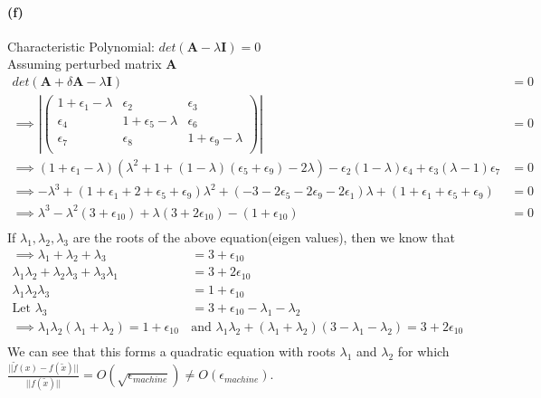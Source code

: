 \documentclass[12pt, letterpaper]{article}
\begin{document}
\paragraph{(f)} Characteristic Polynomial: $det(\mathbf{A}-\lambda \mathbf{I}) = 0$\\

Assuming perturbed matrix \textbf{A}
\begin{align*}
  det(\mathbf{A} + \delta\mathbf{A} - \lambda\mathbf{I}) &= 0\\
  \implies \left|
  \begin{pmatrix}
    1 + \epsilon_1-\lambda & \epsilon_2 & \epsilon_3\\
    \epsilon_4 & 1 + \epsilon_5-\lambda & \epsilon_6\\
    \epsilon_7 & \epsilon_8 & 1 + \epsilon_9-\lambda\\
  \end{pmatrix}
  \right| &= 0\\
  \implies (1 + \epsilon_1 - \lambda)(\lambda^2 + 1 + (1-\lambda)(\epsilon_5 + \epsilon_9) - 2\lambda)
  - \epsilon_2(1-\lambda)\epsilon_4 + \epsilon_3(\lambda - 1)\epsilon_7
  &= 0\\
  \implies -\lambda^3 +
  (1 + \epsilon_1 + 2 + \epsilon_5 + \epsilon_9)\lambda^2 + 
  (-3 -2\epsilon_5 - 2\epsilon_9 -2\epsilon_1)\lambda +
  (1 + \epsilon_1 + \epsilon_5 + \epsilon_9) &= 0\\
  \implies \lambda^3 - \lambda^2(3 + \epsilon_{10}) +
  \lambda(3 + 2\epsilon_{10}) - (1 + \epsilon_{10}) &= 0\\
\end{align*}
If $\lambda_1, \lambda_2, \lambda_3$ are the roots of the above equation(eigen values), then we know that
\begin{align*}
  \implies \lambda_1 + \lambda_2 + \lambda_3 &= 3 + \epsilon_{10} \\
  \lambda_1\lambda_2 + \lambda_2\lambda_3 + \lambda_3\lambda_1 &= 3 + 2\epsilon_{10}\\
  \lambda_1\lambda_2\lambda_3 &= 1 + \epsilon_{10}\\
  \text{Let }\lambda_3 &= 3 + \epsilon_{10} - \lambda_1 - \lambda_2\\
  \implies \lambda_1\lambda_2(\lambda_1 + \lambda_2) = 1 + \epsilon_{10}
  \,&\text{and } \lambda_1\lambda_2 + (\lambda_1 + \lambda_2)(3 - \lambda_1 - \lambda_2) = 3 + 2\epsilon_{10}\\
\end{align*}
We can see that this forms a quadratic equation with roots $\lambda_1$ and $\lambda_2$ for which $\frac{||\tilde{f}(x) - f(\tilde{x})||}{||f(\tilde{x})||} = O(\sqrt{\epsilon_{machine}}) \not = O(\epsilon_{machine})$.
\end{document}
